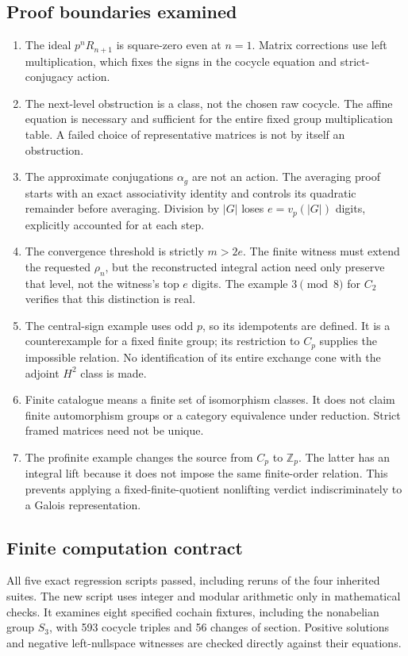 \documentclass[11pt]{article}
\theoremstyle{definition}
\theoremstyle{remark}
\begin{document}
\subsection{Proof boundaries examined}
\begin{enumerate}
\item The ideal $p^nR_{n+1}$ is square-zero even at $n=1$. Matrix corrections use left multiplication, which fixes the signs in the cocycle equation and strict-conjugacy action.
\item The next-level obstruction is a class, not the chosen raw cocycle. The affine equation is necessary and sufficient for the entire fixed group multiplication table. A failed choice of representative matrices is not by itself an obstruction.
\item The approximate conjugations $\alpha_g$ are not an action. The averaging proof starts with an exact associativity identity and controls its quadratic remainder before averaging. Division by $|G|$ loses $e=v_p(|G|)$ digits, explicitly accounted for at each step.
\item The convergence threshold is strictly $m>2e$. The finite witness must extend the requested $\rho_n$, but the reconstructed integral action need only preserve that level, not the witness's top $e$ digits. The example $3\pmod8$ for $C_2$ verifies that this distinction is real.
\item The central-sign example uses odd $p$, so its idempotents are defined. It is a counterexample for a fixed finite group; its restriction to $C_p$ supplies the impossible relation. No identification of its entire exchange cone with the adjoint $H^2$ class is made.
\item Finite catalogue means a finite set of isomorphism classes. It does not claim finite automorphism groups or a category equivalence under reduction. Strict framed matrices need not be unique.
\item The profinite example changes the source from $C_p$ to $\mathbb Z_p$. The latter has an integral lift because it does not impose the same finite-order relation. This prevents applying a fixed-finite-quotient nonlifting verdict indiscriminately to a Galois representation.
\end{enumerate}

\subsection{Finite computation contract}
All five exact regression scripts passed, including reruns of the four inherited suites. The new script uses integer and modular arithmetic only in mathematical checks. It examines eight specified cochain fixtures, including the nonabelian group $S_3$, with 593 cocycle triples and 56 changes of section. Positive solutions and negative left-nullspace witnesses are checked directly against their equations.
\end{document}
